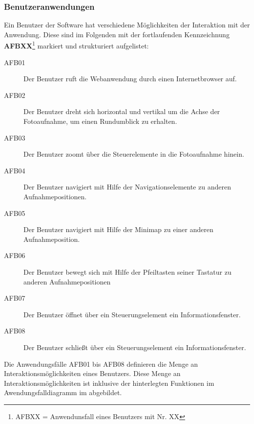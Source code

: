 \subsubsection{Benutzeranwendungen}
\label{sec:Benutzeranwendungen}

Ein Benutzer der Software hat verschiedene Möglichkeiten der Interaktion mit
der Anwendung. Diese sind im Folgenden mit der fortlaufenden
Kennzeichnung \textbf{AFBXX}\footnote{AFBXX = Anwendunsfall eines Benutzers mit
Nr. XX} markiert und strukturiert aufgelistet:

\begin{description}
  \item[AFB01] Der Benutzer ruft die Webanwendung durch einen Internetbrowser
  auf.
  \item[AFB02] Der Benutzer dreht sich horizontal und vertikal um die Achse
  der Fotoaufnahme, um einen Rundumblick zu erhalten.
  \item[AFB03] Der Benutzer zoomt über die Steuerelemente in die Fotoaufnahme
  hinein.
  \item[AFB04] Der Benutzer navigiert mit Hilfe der Navigationselemente zu
  anderen Aufnahmepositionen.
  \item[AFB05] Der Benutzer navigiert mit Hilfe der Minimap zu einer anderen
  Aufnahmeposition.
  \item[AFB06] Der Benutzer bewegt sich mit Hilfe der Pfeiltasten seiner
  Tastatur zu anderen Aufnahmepositionen
  \item[AFB07] Der Benutzer öffnet über ein Steuerungselement ein
  Informationsfenster.
  \item[AFB08] Der Benutzer schließt über ein Steuerungselement ein
  Informationsfenster.
\end{description}

Die Anwendungsfälle AFB01 bis AFB08 definieren die Menge an
Interaktionsmöglichkeiten eines Benutzers. Diese Menge an
Interaktionsmöglichkeiten ist inklusive der hinterlegten Funktionen im
Awendungsfalldiagramm im  abgebildet.
